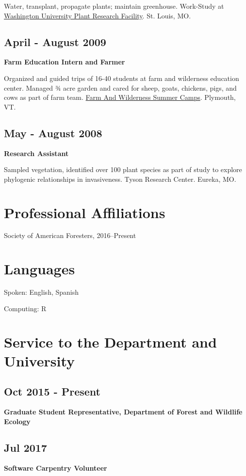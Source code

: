 \documentclass{article}
\begin{document}
Water, transplant, propagate plants; maintain greenhouse. Work-Study
at \href{http://biology4.wustl.edu/greenhouse/index.html}{Washington University Plant Research Facility}. St. Louis, MO.

\subsection*{April - August 2009}
\label{sec:orga37cfa7}
\textbf{Farm Education Intern and Farmer}

Organized and guided trips of 16-40 students at farm and wilderness
education center. Managed 3⁄4 acre garden and cared for sheep, goats,
chickens, pigs, and cows as part of farm team.  \href{https://farmandwilderness.org/}{Farm And Wilderness
Summer Camps}. Plymouth, VT.

\subsection*{May - August 2008}
\label{sec:org6dfcc2e}
\textbf{Research Assistant}

Sampled vegetation, identified over 100 plant species as part of study
to explore phylogenic relationships in invasiveness.  Tyson Research
Center. Eureka, MO.
\section*{Professional Affiliations}
\label{sec:org7e95bc9}
Society of American Foresters, 2016--Present

\section*{Languages}
\label{sec:org757fbca}
Spoken: English, Spanish

Computing: R

\section*{Service to the Department and University}
\label{sec:org1fc835d}
\subsection*{Oct 2015 - Present}
\label{sec:org732741b}
\textbf{Graduate Student Representative, Department of Forest and Wildlife
Ecology}
\subsection*{Jul 2017}
\label{sec:orgb64eeba}
\textbf{Software Carpentry Volunteer}
\end{document}
